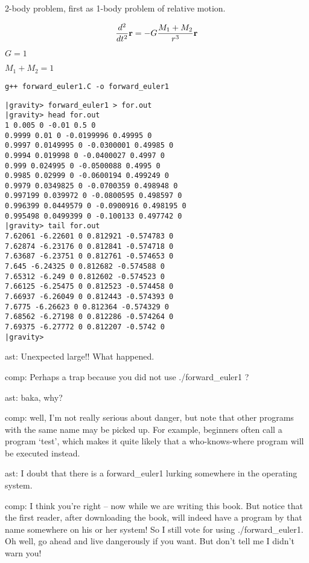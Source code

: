 2-body problem, first as 1-body problem of relative motion.

$$
\frac{d^2}{dt^2}{\bf r} = - G \frac{M_1 + M_2}{r^3}{\bf r}
$$

$G=1$

$M_1 + M_2 = 1$



\begin{verbatim}
g++ forward_euler1.C -o forward_euler1
\end{verbatim}

\begin{verbatim}
|gravity> forward_euler1 > for.out
|gravity> head for.out
1 0.005 0 -0.01 0.5 0
0.9999 0.01 0 -0.0199996 0.49995 0
0.9997 0.0149995 0 -0.0300001 0.49985 0
0.9994 0.019998 0 -0.0400027 0.4997 0
0.999 0.024995 0 -0.0500088 0.4995 0
0.9985 0.02999 0 -0.0600194 0.499249 0
0.9979 0.0349825 0 -0.0700359 0.498948 0
0.997199 0.039972 0 -0.0800595 0.498597 0
0.996399 0.0449579 0 -0.0900916 0.498195 0
0.995498 0.0499399 0 -0.100133 0.497742 0
|gravity> tail for.out
7.62061 -6.22601 0 0.812921 -0.574783 0
7.62874 -6.23176 0 0.812841 -0.574718 0
7.63687 -6.23751 0 0.812761 -0.574653 0
7.645 -6.24325 0 0.812682 -0.574588 0
7.65312 -6.249 0 0.812602 -0.574523 0
7.66125 -6.25475 0 0.812523 -0.574458 0
7.66937 -6.26049 0 0.812443 -0.574393 0
7.6775 -6.26623 0 0.812364 -0.574329 0
7.68562 -6.27198 0 0.812286 -0.574264 0
7.69375 -6.27772 0 0.812207 -0.5742 0
|gravity>
\end{verbatim}

ast: Unexpected large!! What happened.

comp: Perhaps a trap because you did not use ./forward\_euler1 ?

ast: baka, why?

comp: well, I'm not really serious about danger, but note that other
programs with the same name may be picked up.  For example, beginners
often call a program `test', which makes it quite likely that a
who-knows-where program will be executed instead.

ast: I doubt that there is a forward\_euler1 lurking somewhere in the
operating system.

comp: I think you're right -- now while we are writing this book.  But
notice that the first reader, after downloading the book, will indeed
have a program by that name somewhere on his or her system!  So I
still vote for using ./forward\_euler1.  Oh well, go ahead and live
dangerously if you want.  But don't tell me I didn't warn you!

